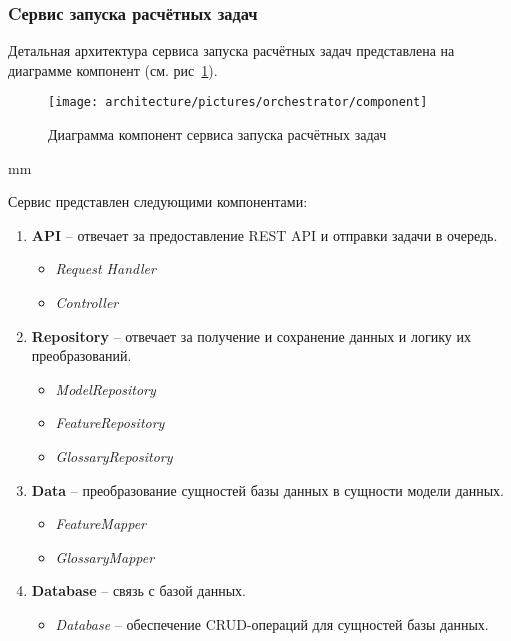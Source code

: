 \subsubsection{\large{Cервис запуска расчётных задач}}

Детальная архитектура сервиса запуска расчётных задач представлена на диаграмме компонент
(см. рис\ \ref{pic:architecture__orchestrator-component}).

\begin{figure}[H]
	\hspace*{-2.5 cm}\texttt{[image: architecture/pictures/orchestrator/component]}
	\caption{Диаграмма компонент сервиса запуска расчётных задач}
	\label{pic:architecture__orchestrator-component}
\end{figure}
 mm

Сервис представлен следующими компонентами:
\begin{enumerate}
	\item {
		\textbf{API} -- отвечает за предоставление REST API и отправки задачи в очередь.
		\begin{itemize}
			\item \textit{Request Handler}
			\item \textit{Controller}
		\end{itemize}
	}
	\item {
		\textbf{Repository} -- отвечает за получение и сохранение данных и логику их преобразований.
		\begin{itemize}
			\item \textit{ModelRepository}
			\item \textit{FeatureRepository}
			\item \textit{GlossaryRepository}
		\end{itemize}
	}
	\item {
		\textbf{Data} -- преобразование сущностей базы данных в сущности модели данных.
		\begin{itemize}
			\item \textit{FeatureMapper}
			\item \textit{GlossaryMapper}
		\end{itemize}
	}
	\item {
		\textbf{Database} -- связь с базой данных.
		\begin{itemize}
			\item \textit{Database} -- обеспечение CRUD-операций для сущностей базы данных.
		\end{itemize}
	}
\end{enumerate}